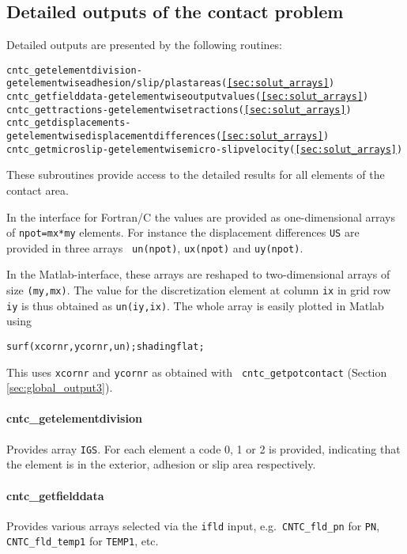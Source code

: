 \documentclass[12pt]{report}
\renewcommand{\magenta}[1]{}
\begin{document}
\subsection{Detailed outputs of the contact problem}

Detailed outputs are presented by the following routines:
\begin{alltt}\small
cntc_getelementdivision    - get elementwise adhesion/slip/plast areas (\ref{sec:solut_arrays})
cntc_getfielddata          - get elementwise output values (\ref{sec:solut_arrays})
cntc_gettractions          - get elementwise tractions (\ref{sec:solut_arrays})
cntc_getdisplacements      - get elementwise displacement differences (\ref{sec:solut_arrays})
cntc_getmicroslip          - get elementwise micro-slip velocity (\ref{sec:solut_arrays})\magenta{
cntc_getrcfindex           - get elementwise RCF index (-).}
\end{alltt}
These subroutines provide access to the detailed results for all elements
of the contact area.

In the interface for Fortran/C the values are provided as
one-dimensional arrays of {\tt npot=mx*my} elements. For instance the
displacement differences {\tt US} are provided in three arrays {\tt
un(npot)}, {\tt ux(npot)} and {\tt uy(npot)}. 

In the Matlab-interface, these arrays are reshaped to two-dimensional
arrays of size {\tt (my,mx)}. The value for the discretization element at
column {\tt ix} in grid row {\tt iy} is thus obtained as {\tt un(iy,ix)}.
The whole array is easily plotted in Matlab using
\begin{alltt}\small
  surf(xcornr, ycornr, un); shading flat;
\end{alltt}
This uses {\tt xcornr} and {\tt ycornr} as obtained with {\tt
cntc\_getpotcontact} (Section \ref{sec:global_output3}).

\paragraph{cntc\_getelementdivision} Provides array {\tt IGS}. For each
element a code 0, 1 or 2 is provided, indicating that the element is in the
exterior, adhesion or slip area respectively.

\paragraph{cntc\_getfielddata} Provides various arrays selected via the
{\tt ifld} input, e.g.\ {\tt CNTC\_fld\_pn} for {\tt PN}, {\tt
CNTC\_fld\_temp1} for {\tt TEMP1}, etc.
\end{document}

